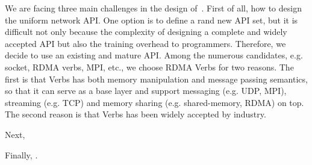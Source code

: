 We are facing three main challenges in the design of~\sysname. First of all, 
how to design the uniform network API. One option is to define a rand new API 
set, but it is difficult not only because the complexity of designing a complete
and widely accepted API but also the training overhead to programmers.
Therefore, we decide to use an existing and mature API. Among the numerous candidates, e.g. socket, RDMA verbs, MPI, etc., we choose RDMA Verbs for two
reasons. The first is that Verbs has both memory manipulation and message passing
semantics, so that it can serve as a base layer and support messaging (e.g. UDP,
MPI), streaming (e.g. TCP) and memory sharing (e.g. shared-memory, RDMA) on top.
The second reason is that Verbs has been widely accepted by industry.

Next, 

Finally, .